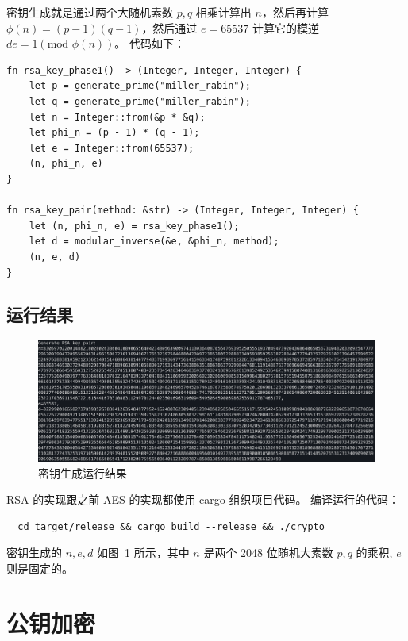 \documentclass[degree=project,degree-type=project,cjk-font=windows]{thuthesis}
\begin{document}
密钥生成就是通过两个大随机素数 $p,q$ 相乘计算出 $n$，然后再计算 $\phi(n) = (p-1)(q-1)$，然后通过 $e = 65537$ 计算它的模逆 $de = 1 (\text{mod } \phi(n))$。
代码如下：

  \begin{verbatim}
fn rsa_key_phase1() -> (Integer, Integer, Integer) {
    let p = generate_prime("miller_rabin");
    let q = generate_prime("miller_rabin");
    let n = Integer::from(&p * &q);
    let phi_n = (p - 1) * (q - 1);
    let e = Integer::from(65537);
    (n, phi_n, e)
}

fn rsa_key_pair(method: &str) -> (Integer, Integer, Integer) {
    let (n, phi_n, e) = rsa_key_phase1();
    let d = modular_inverse(&e, &phi_n, method);
    (n, e, d)
}
\end{verbatim}

\subsection{运行结果}

\begin{figure}[h]
\centering%
\includegraphics[width=\linewidth]{rsa_t1.png}
  \caption{密钥生成运行结果}
  \label{fig:t1}
\end{figure}

RSA 的实现跟之前 AES 的实现都使用 cargo 组织项目代码。
编译运行的代码：

  \begin{verbatim}
  cd target/release && cargo build --release && ./crypto
  \end{verbatim}

密钥生成的 $n, e, d$ 如图~\ref{fig:t1} 所示，其中 $n$ 是两个 2048 位随机大素数 $p, q$ 的乘积, $e$ 则是固定的。

\section{公钥加密}
\end{document}
